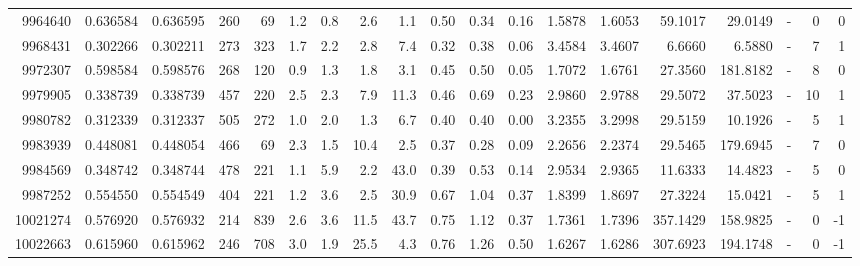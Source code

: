 \begin{tabular}{rrrrrrrrrrrrrrrrlrr}
   9964640 & 0.636584 &   0.636595 &  260 &   69 &      1.2 &      0.8 &     2.6 &      1.1 &       0.50 &        0.34 &        0.16 &  1.5878 &  1.6053 &   59.1017 &   29.0149 &             - &        0 &          0 \\
   9968431 & 0.302266 &   0.302211 &  273 &  323 &      1.7 &      2.2 &     2.8 &      7.4 &       0.32 &        0.38 &        0.06 &  3.4584 &  3.4607 &    6.6660 &    6.5880 &             - &        7 &          1 \\
   9972307 & 0.598584 &   0.598576 &  268 &  120 &      0.9 &      1.3 &     1.8 &      3.1 &       0.45 &        0.50 &        0.05 &  1.7072 &  1.6761 &   27.3560 &  181.8182 &             - &        8 &          0 \\
   9979905 & 0.338739 &   0.338739 &  457 &  220 &      2.5 &      2.3 &     7.9 &     11.3 &       0.46 &        0.69 &        0.23 &  2.9860 &  2.9788 &   29.5072 &   37.5023 &             - &       10 &          1 \\
   9980782 & 0.312339 &   0.312337 &  505 &  272 &      1.0 &      2.0 &     1.3 &      6.7 &       0.40 &        0.40 &        0.00 &  3.2355 &  3.2998 &   29.5159 &   10.1926 &             - &        5 &          1 \\
   9983939 & 0.448081 &   0.448054 &  466 &   69 &      2.3 &      1.5 &    10.4 &      2.5 &       0.37 &        0.28 &        0.09 &  2.2656 &  2.2374 &   29.5465 &  179.6945 &             - &        7 &          0 \\
   9984569 & 0.348742 &   0.348744 &  478 &  221 &      1.1 &      5.9 &     2.2 &     43.0 &       0.39 &        0.53 &        0.14 &  2.9534 &  2.9365 &   11.6333 &   14.4823 &             - &        5 &          0 \\
   9987252 & 0.554550 &   0.554549 &  404 &  221 &      1.2 &      3.6 &     2.5 &     30.9 &       0.67 &        1.04 &        0.37 &  1.8399 &  1.8697 &   27.3224 &   15.0421 &             - &        5 &          1 \\
  10021274 & 0.576920 &   0.576932 &  214 &  839 &      2.6 &      3.6 &    11.5 &     43.7 &       0.75 &        1.12 &        0.37 &  1.7361 &  1.7396 &  357.1429 &  158.9825 &             - &        0 &         -1 \\
  10022663 & 0.615960 &   0.615962 &  246 &  708 &      3.0 &      1.9 &    25.5 &      4.3 &       0.76 &        1.26 &        0.50 &  1.6267 &  1.6286 &  307.6923 &  194.1748 &             - &        0 &         -1 \\

\end{tabular}
